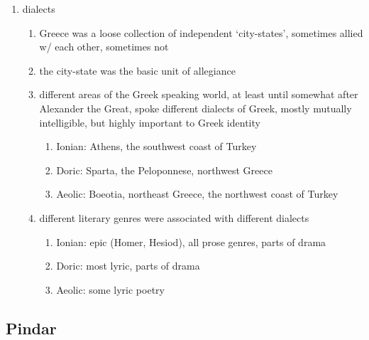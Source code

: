 \documentclass[12pt]{article}
\begin{document}
\begin{enumerate}
\begin{enumerate}
        \end{enumerate}
    \item dialects
        \begin{enumerate}
        \item Greece was a loose collection of independent `city-states', sometimes allied w/ each other, sometimes not
        \item the city-state was the basic unit of allegiance
        \item different areas of the Greek speaking world, at least until somewhat after Alexander the Great, spoke different dialects of Greek, mostly mutually intelligible, but highly important to Greek identity
            \begin{enumerate}
            \item Ionian: Athens, the southwest coast of Turkey
            \item Doric: Sparta, the Peloponnese, northwest Greece
            \item Aeolic: Boeotia, northeast Greece, the northwest coast of Turkey
            \end{enumerate}
        \item different literary genres were associated with different dialects
            \begin{enumerate}
            \item Ionian: epic (Homer, Hesiod), all prose genres, parts of drama
            \item Doric: most lyric, parts of drama
            \item Aeolic: some lyric poetry
            \end{enumerate}
        \end{enumerate}
\end{enumerate}

\subsection{Pindar}
\end{document}
